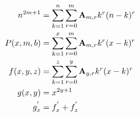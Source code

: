 \begin{equation}
    \begin{split}
        n^{2m+1} &= \sum_{k=1}^{n} \sum_{r=0}^{m} {\mathbf{A}} \sb{m,r} k^r (n-k)^r\\
        P(x, m, b) &= \sum_{k=1}^{x} \sum_{r=0}^{m} {\mathbf{A}} \sb{m,r} k^r (x-k)^r \\
        f(x, y, z) &= \sum_{k=1}^{z} \sum_{r=0}^{y} {\mathbf{A}} \sb{y,r} k^r (x-k)^r \\
        g(x,y) &= x^{2y+1} \\
        g^{'}_{x} &= f^{'}_{x} + f^{'}_{z}
    \end{split}\label{eq:equation}
\end{equation}